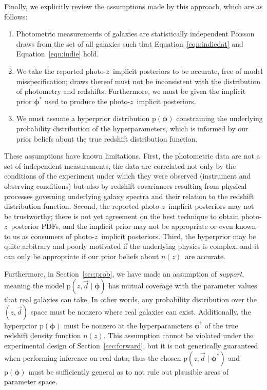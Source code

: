 \documentclass[iop]{emulateapj}
\newcommand{\Eq}[1]{Equation~\ref{#1}}
\newcommand{\data}{\ensuremath{\vec{d}}}%
\newcommand{\pr}[1]{\ensuremath{\mathrm{p}(#1)}}%
\newcommand{\gvn}{\mid}%
\newcommand{\pz}{photo-$z$}
\newcommand{\pzpdf}{\pz\ posterior PDF}%
\newcommand{\pzip}{\pz\ implicit posterior}
\newcommand{\nz}{$n(z)$}
\newcommand{\bvec}[1]{\ensuremath{\boldsymbol{#1}}}%
\newcommand{\ndphi}{\bvec{\phi}}
\begin{document}
Finally, we explicitly review the assumptions made by this approach, which are as follows:
\begin{enumerate}
	\item Photometric measurements of galaxies are statistically independent Poisson draws from the set of all galaxies such that \Eq{eqn:indiedat} and \Eq{eqn:indie} hold.
	\item We take the reported \pzip s to be accurate, free of model misspecification;
	draws thereof must not be inconsistent with the distribution of photometry and redshifts.
	Furthermore, we must be given the implicit prior $\ndphi^{*}$ used to produce the \pzip s.
	\item We must assume a hyperprior distribution $\pr{\ndphi}$ constraining the underlying probability distribution of the hyperparameters, which is informed by our prior beliefs about the true redshift distribution function.
\end{enumerate}

These assumptions have known limitations.
First, the photometric data are not a set of independent measurements;
the data are correlated not only by the conditions of the experiment under which they were observed (instrument and observing conditions) but also by redshift covariances resulting from physical processes governing underlying galaxy spectra and their relation to the redshift distribution function.
Second, the reported \pzip s may not be trustworthy;
there is not yet agreement on the best technique to obtain \pzpdf s, and the implicit prior may not be appropriate or even known to us as consumers of \pzip s.
Third, the hyperprior may be quite arbitrary and poorly motivated if the underlying physics is complex, and it can only be appropriate if our prior beliefs about \nz\ are accurate.

Furthermore, in Section~\ref{sec:prob}, we have made an assumption of \textit{support}, meaning the model $\pr{z, \data \gvn \ndphi}$ has mutual coverage with the parameter values that real galaxies can take.
In other words, any probability distribution over the $(z, \data)$ space must be nonzero where real galaxies can exist.
Additionally, the hyperprior $\pr{\ndphi}$ must be nonzero at the hyperparameters $\ndphi^{\dagger}$ of the true redshift density function \nz.
This assumption cannot be violated under the experimental design of Section~\ref{sec:forward}, but it is not generically guaranteed when performing inference on real data;
thus the chosen $\pr{z, \data \gvn \ndphi^{*}}$ and $\pr{\ndphi}$ must be sufficiently general as to not rule out plausible areas of parameter space.
\end{document}
